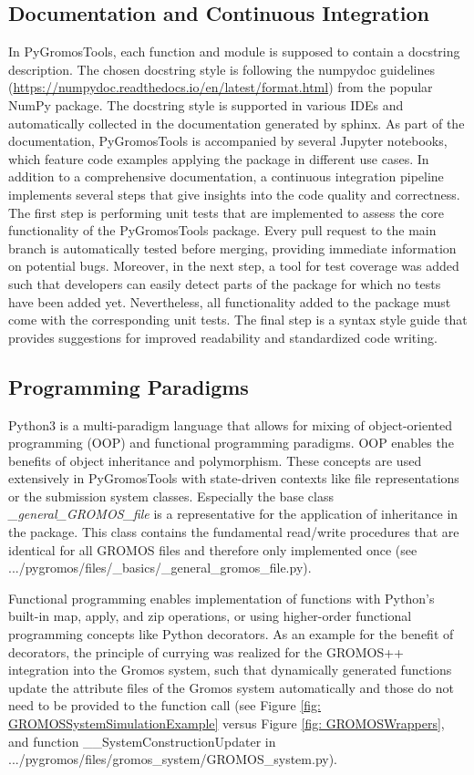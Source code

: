 \subsection{Documentation and Continuous Integration}
In PyGromosTools, each function and module is supposed to contain a docstring description. The chosen docstring style is following the numpydoc guidelines (\url{https://numpydoc.readthedocs.io/en/latest/format.html}) from the popular NumPy package.\cite{Vanderwalt2011} The docstring style is supported in various IDEs and automatically collected in the documentation generated by sphinx\cite{brandl2021}. As part of the documentation, PyGromosTools is accompanied by several Jupyter notebooks, which feature code examples applying the package in different use cases.\cite{Kluyver2016}
In addition to a comprehensive documentation, a continuous integration pipeline implements several steps that give insights into the code quality and correctness. The first step is performing unit tests that are implemented to assess the core functionality of the PyGromosTools package. Every pull request to the main branch is automatically tested before merging, providing immediate information on potential bugs. Moreover, in the next step, a tool for test coverage was added such that developers can easily detect parts of the package for which no tests have been added yet. Nevertheless, all functionality added to the package must come with the corresponding unit tests. The final step is a syntax style guide that provides suggestions for improved readability and standardized code writing.

\subsection{Programming Paradigms}
Python3 is a multi-paradigm language that allows for mixing of object-oriented programming (OOP)\cite{Kay1993} and functional programming paradigms. 
OOP enables the benefits of object inheritance and polymorphism.\cite{Ganney2020} These concepts are used extensively in PyGromosTools with state-driven contexts like file representations or the submission system classes. Especially the base class \textit{\_general\_GROMOS\_file} is a representative for the application of inheritance in the package. This class contains the fundamental read/write procedures that are identical for all GROMOS files and therefore only implemented once (see .../pygromos/files/\_basics/\_general\_gromos\_file.py).

Functional programming enables implementation of functions with Python's built-in map, apply, and zip operations, or using higher-order functional programming concepts like Python decorators.\cite{Ganney2020} As an example for the benefit of decorators, the principle of currying\cite{Curry1958} was realized for the GROMOS++ integration into the Gromos system, such that dynamically generated functions update the attribute files of the Gromos system automatically and those do not need to be provided to the function call (see Figure \ref{fig: GROMOSSystemSimulationExample} versus Figure \ref{fig: GROMOSWrappers}, and function \_\_SystemConstructionUpdater in .../pygromos/files/gromos\_system/GROMOS\_system.py).

